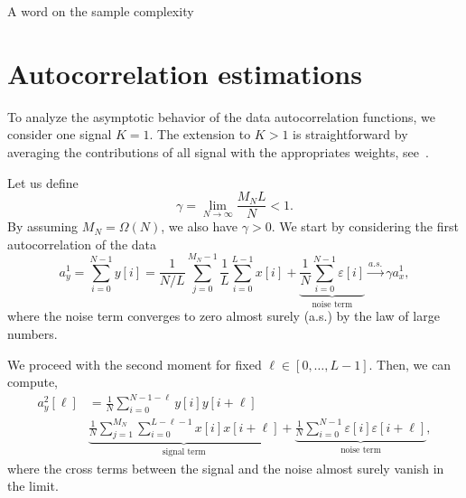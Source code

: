 \documentclass[english,11pt]{article}
\numberwithin{equation}{section}
\theoremstyle{plain}
\theoremstyle{definition}
\theoremstyle{remark}
\theoremstyle{plain}
\theoremstyle{remark}
\theoremstyle{plain}
\theoremstyle{plain}
\begin{document}
A word on the sample complexity






\appendix

\section{Autocorrelation estimations} \label{sec:autocorrelation_computation}
 
To analyze the asymptotic behavior of the data autocorrelation functions, we consider one signal $K=1$. The extension to $K>1$ is straightforward by averaging the contributions of all signal with the appropriates weights, see~\cite{boumal2017heterogeneous}. 

Let us define
\begin{equation}
\gamma = \lim_{N\to\infty} \frac{M_NL}{N}<1.
\end{equation}
By assuming $M_N=\Omega(N)$, we also have $\gamma>0$.
We start by considering the first autocorrelation of the data
\begin{equation}
a_y^1 = \sum_{i=0}^{N-1} y[i] = \frac{1}{N/L}\sum_{j=0}^{M_N-1}\frac{1}{L}\sum_{i=0}^{L-1}x[i] + \underbrace{\frac{1}{N}\sum_{i=0}^{N-1}\varepsilon[i]}_{\text{noise term}} \xrightarrow{a.s.}\gamma a_x^1,
\end{equation}
where the noise term converges to zero almost surely (a.s.) by the law of large numbers.

We proceed with the second moment for fixed $\ell\in[0,\ldots,L-1]$. Then, we can compute, 
\begin{equation}
\begin{split}
a_y^2[\ell] & = \frac{1}{N}\sum_{i=0}^{N-1-\ell}y[i]y[i+\ell] \\
& \underbrace{\frac{1}{N}\sum_{j=1}^{M_N}\sum_{i=0}^{L-\ell-1}x[i]x[i+\ell]}_{\text{signal term}} + \underbrace{\frac{1}{N}\sum_{i=0}^{N-1}\varepsilon[i]\varepsilon[i+\ell]}_{\text{noise term}},
\end{split}
\end{equation}
where the cross terms between the signal and the noise almost surely vanish in the limit. 
\end{document}
